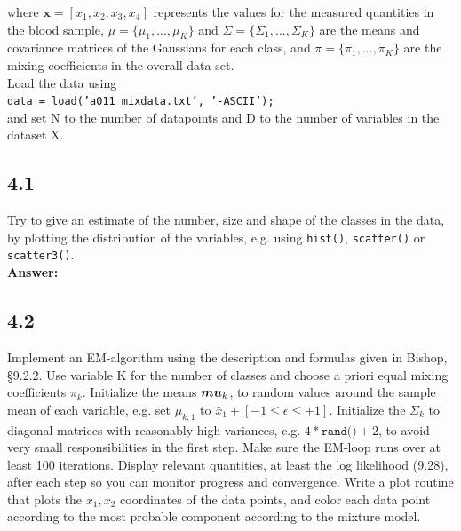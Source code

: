 \documentclass[a4paper]{article}
\begin{document}
where $\textbf{x} = [x_1, x_2, x_3, x_4]$ represents the values for the measured quantities in the blood sample, $\mu = \{ \mu_1, ..., \mu_K\}$ and $\Sigma = \{ \Sigma_1, ..., \Sigma_K\}$ are the means and covariance matrices of the Gaussians for each class, and $\pi = \{ \pi_1, ..., \pi_K\}$ are the mixing coefficients in the overall data set.\\

Load the data using\\

\hspace{1cm} \texttt{data = load('a011\_mixdata.txt', '-ASCII');}\\

and set N to the number of datapoints and D to the number of variables in the dataset X.

\subsection*{4.1}

Try to give an estimate of the number, size and shape of the classes in the data, by plotting the distribution of the variables, e.g. using \texttt{hist()}, \texttt{scatter()} or \texttt{scatter3()}.\\

\textbf{Answer:}\\






\subsection*{4.2}

Implement an EM-algorithm using the description and formulas given in Bishop, §9.2.2. Use variable K for the number of classes and choose a priori equal mixing coefficients $\pi_k$. Initialize the means $\boldsymbol{\\mu}_k$, to random values around the sample mean of each variable, e.g. set $\mu_{k,1}$ to  $\bar{x}_1 + [-1 \leq \epsilon \leq +1]$. Initialize the $\Sigma_k$ to diagonal matrices with reasonably high variances, e.g. $4*\texttt{rand()}+2$, to avoid very small responsibilities in the first step. Make sure the EM-loop runs over at least 100 iterations. Display relevant quantities, at least the log likelihood (9.28), after each step so you can monitor progress and convergence. Write a plot routine that plots the $x_1, x_2$ coordinates of the data points, and color each data point according to the most probable component according to the mixture model.\\
\end{document}
